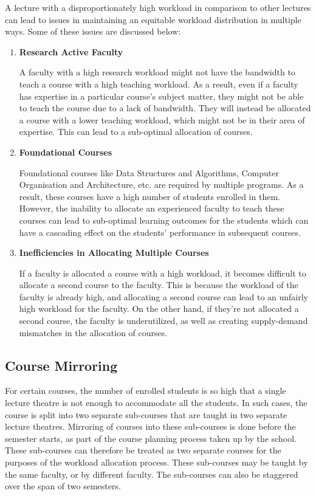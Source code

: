 A lecture with a disproportionately high workload in comparison to other lectures can lead to issues in maintaining an equitable workload distribution in multiple ways. Some of these issues are discussed below:

\begin{enumerate}

  \item \textbf{Research Active Faculty}

        A faculty with a high research workload might not have the bandwidth to teach a course with a high teaching workload. As a result, even if a faculty has expertise in a particular course's subject matter, they might not be able to teach the course due to a lack of bandwidth. They will instead be allocated a course with a lower teaching workload, which might not be in their area of expertise. This can lead to a sub-optimal allocation of courses.

  \item \textbf{Foundational Courses}

        Foundational courses like Data Structures and Algorithms, Computer Organisation and Architecture, etc. are required by multiple programs. As a result, these courses have a high number of students enrolled in them. However, the inability to allocate an experienced faculty to teach these courses can lead to sub-optimal learning outcomes for the students which can have a cascading effect on the students' performance in subsequent courses.

  \item \textbf{Inefficiencies in Allocating Multiple Courses}

        If a faculty is allocated a course with a high workload, it becomes difficult to allocate a second course to the faculty. This is because the workload of the faculty is already high, and allocating a second course can lead to an unfairly high workload for the faculty. On the other hand, if they're not allocated a second course, the faculty is underutilized, as well as creating supply-demand mismatches in the allocation of courses.

\end{enumerate}

\subsection{Course Mirroring}

For certain courses, the number of enrolled students is so high that a single lecture theatre is not enough to accommodate all the students. In such cases, the course is split into two separate sub-courses that are taught in two separate lecture theatres. Mirroring of courses into these sub-courses is done before the semester starts, as part of the course planning process taken up by the school. These sub-courses can therefore be treated as two separate courses for the purposes of the workload allocation process.  These sub-courses may be taught by the same faculty, or by different faculty. The sub-courses can also be staggered over the span of two semesters.



